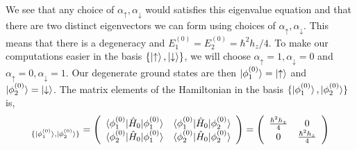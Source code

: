 \documentclass[10pt]{article}
\newcommand{\1}{\mathbf 1}
\begin{document}
We see that any choice of $\alpha_\uparrow, \alpha_\downarrow$ would satisfies this eigenvalue equation and that there are two distinct eigenvectors we can form using choices of $\alpha_\uparrow, \alpha_\downarrow$.
This means that there is a degeneracy and $E_1^{(0)} = E_2^{(0)} = \hbar^2 h_z / 4$.
To make our computations easier in the basis $\{\ket{\uparrow}, \ket{\downarrow}\}$, we will choose $\alpha_\uparrow =1, \alpha_\downarrow = 0$ and $\alpha_\uparrow = 0, \alpha_\downarrow = 1$.
Our degenerate ground states are then $\ket{\phi_1^{(0)}} = \ket{\uparrow}$ and $\ket{\phi_2^{(0)}} = \ket{\downarrow}$.
The matrix elements of the Hamiltonian in the basis $\{\ket{\phi_1^{(0)}},\ket{\phi_2^{(0)}}\}$ is,
\begin{align}
	[\hat H_0]_{\{\ket{\phi_1^{(0)}},\ket{\phi_2^{(0)}}\}}
	=
	\left(
		\begin{array}{cc}
			\braket{\phi_1^{(0)} | \hat H_0 | \phi_1^{(0)}} & \braket{\phi_1^{(0)} | \hat H_0 | \phi_2^{(0)}}\\
			\braket{\phi_2^{(0)} | \hat H_0 | \phi_1^{(0)}} & \braket{\phi_2^{(0)} | \hat H_0 | \phi_2^{(0)}}
		\end{array}
	\right)
	=
	\left(
	\begin{array}{cc}
		\frac{\hbar^2h_z}{4} & 0\\
		0 & \frac{\hbar^2h_z}{4}\\
	\end{array}
	\right)
\end{align}
\end{document}
